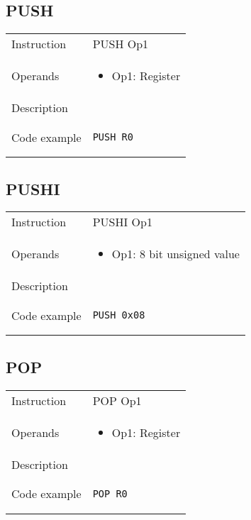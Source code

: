\subsection{PUSH}
\renewcommand*{\arraystretch}{2.0}
\begin{longtable}{P{3cm}P{9cm}}
\midrule
\noindent Instruction & PUSH Op1 \\
\noindent Operands &
\begin{itemize}[label={},noitemsep,leftmargin=*,topsep=0pt,partopsep=0pt, itemsep=1em]
\item Op1: Register
\end{itemize}\\
\noindent Description &  \\
\noindent Code example & 
\begin{lstlisting}
PUSH R0
\end{lstlisting} \\
\end{longtable}


\subsection{PUSHI}
\renewcommand*{\arraystretch}{2.0}
\begin{longtable}{P{3cm}P{9cm}}
\midrule
\noindent Instruction & PUSHI Op1 \\
\noindent Operands &
\begin{itemize}[label={},noitemsep,leftmargin=*,topsep=0pt,partopsep=0pt, itemsep=1em]
\item Op1: 8 bit unsigned value
\end{itemize}\\
\noindent Description &  \\
\noindent Code example & 
\begin{lstlisting}
PUSH 0x08
\end{lstlisting} \\
\end{longtable}

\newpage

\subsection{POP}
\renewcommand*{\arraystretch}{2.0}
\begin{longtable}{P{3cm}P{9cm}}
\midrule
\noindent Instruction & POP Op1 \\
\noindent Operands &
\begin{itemize}[label={},noitemsep,leftmargin=*,topsep=0pt,partopsep=0pt, itemsep=1em]
\item Op1: Register
\end{itemize}\\
\noindent Description &  \\
\noindent Code example & 
\begin{lstlisting}
POP R0
\end{lstlisting} \\
\end{longtable}



